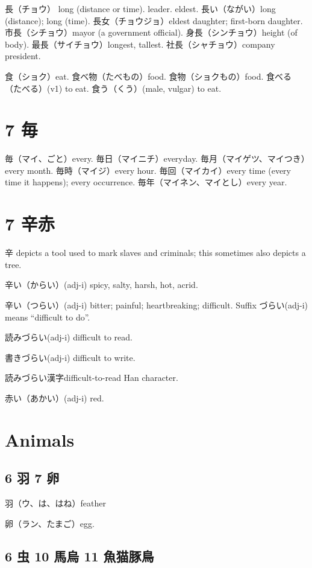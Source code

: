 長（チョウ）
long (distance or time).
leader.
eldest.
長い（ながい）long (distance); long (time).
長女（チョウジョ）eldest daughter; first-born daughter.
市長（シチョウ）mayor (a government official).
身長（シンチョウ）height (of body).
最長（サイチョウ）longest, tallest.
社長（シャチョウ）company president.

食（ショク）eat.
食べ物（たべもの）food.
食物（ショクもの）food.
食べる（たべる）(v1) to eat.
食う（くう）(male, vulgar) to eat.

\section{7 毎}

毎（マイ、ごと）every.
毎日（マイニチ）everyday.
毎月（マイゲツ、マイつき）every month.
毎時（マイジ）every hour.
毎回（マイカイ）every time (every time it happens); every occurrence.
毎年（マイネン、マイとし）every year.

\section{7 辛赤}

辛 depicts a tool used to mark slaves and criminals;
this sometimes also depicts a tree.

辛い（からい）(adj-i) spicy, salty, harsh, hot, acrid.

辛い（つらい）(adj-i) bitter; painful; heartbreaking; difficult.
Suffix づらい(adj-i) means ``difficult to do''.

読みづらい(adj-i) difficult to read.

書きづらい(adj-i) difficult to write.

読みづらい漢字difficult-to-read Han character.

赤い（あかい）(adj-i) red.

\section{Animals}

\subsection{6 羽 7 卵}

羽（ウ、は、はね）feather

卵（ラン、たまご）egg.

\subsection{6 虫 10 馬烏 11 魚猫豚鳥}

